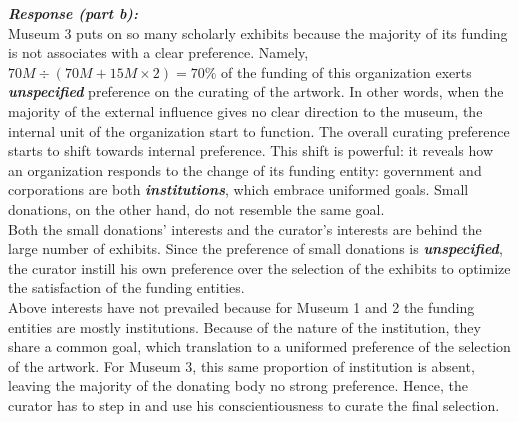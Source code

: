 \documentclass[12pt]{article}
\newcommand\tab[1][1cm]{\hspace*{#1}}
\begin{document}
\textbf{\emph{Response (part b): }} \\
\tab Museum 3 puts on so many scholarly exhibits because the majority of its funding is not associates with a clear preference. Namely, $70M \div (70M + 15M \times 2) = 70\%$ of the funding of this organization exerts \textbf{\emph{unspecified}} preference on the curating of the artwork. In other words, when the majority of the external influence gives no clear direction to the museum, the internal unit of the organization start to function. The overall curating preference starts to shift towards internal preference. This shift is powerful: it reveals how an organization responds to the change of its funding entity: government and corporations are both \textbf{\emph{institutions}}, which embrace uniformed goals. Small donations, on the other hand, do not resemble the same goal. \\
\tab Both the small donations' interests and the curator's interests are behind the large number of exhibits. Since the preference of small donations is \textbf{\emph{unspecified}}, the curator instill his own preference over the selection of the exhibits to optimize the satisfaction of the funding entities.  \\
\tab Above interests have not prevailed because for Museum 1 and 2 the funding entities are mostly institutions. Because of the nature of the institution, they share a common goal, which translation to a uniformed preference of the selection of the artwork. For Museum 3, this same proportion of institution is absent, leaving the majority of the donating body no strong preference. Hence, the curator has to step in and use his conscientiousness to curate the final selection.
\end{document}
